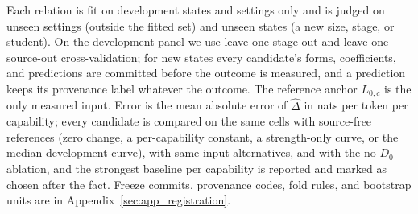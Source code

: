 Each relation is fit on development states and settings only and is
judged on unseen settings (outside the fitted set) and unseen states
(a new size, stage, or student). On the development panel we use leave-one-stage-out and
leave-one-source-out cross-validation; for new states every
candidate's forms, coefficients, and predictions are committed before
the outcome is measured, and a prediction keeps its provenance label
whatever the outcome. The reference anchor $L_{0,c}$ is the only measured input. Error is the mean
absolute error of $\widehat\Delta$ in nats per token per capability;
every candidate is compared on the same cells with source-free
references (zero change, a per-capability constant, a strength-only
curve, or the median development curve), with same-input alternatives,
and with the no-$D_0$ ablation, and the strongest baseline per
capability is reported and marked as chosen after the fact. Freeze
commits, provenance codes, fold rules, and bootstrap units are in
Appendix~\ref{sec:app_registration}.

